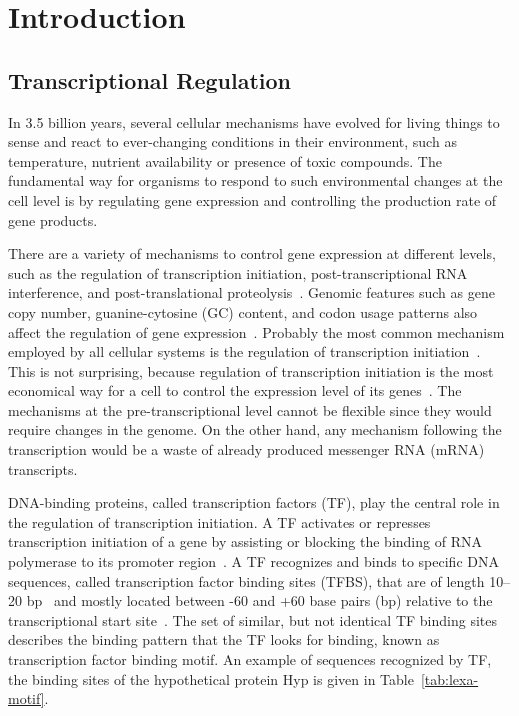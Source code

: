 
\chapter{Introduction}

\section{Transcriptional Regulation}

In 3.5 billion years, several
cellular mechanisms have evolved for living things to sense and react to
ever-changing conditions in their environment, such as temperature, nutrient
availability or presence of toxic compounds. The fundamental way for organisms
to respond to such environmental changes at the cell level is by regulating
gene expression and controlling the production rate of gene products.

There are a variety of mechanisms to control gene expression at different
levels, such as the regulation of transcription
initiation, post-transcriptional RNA interference, and post-translational
proteolysis~\citep{snyder2007molecular}. Genomic features such as gene copy
number, guanine-cytosine (GC) content, and codon usage patterns also affect the
regulation of gene expression~\citep{gustafsson2004codon,
  stranger2007relative}. Probably the most common mechanism employed by all
cellular systems is the regulation of transcription
initiation~\citep{browning2004regulation}. This is not surprising, because
regulation of transcription initiation is the most economical way for a cell to
control the expression level of its genes~\citep{malacinski2005essentials}. The
mechanisms at the pre-transcriptional level cannot be flexible since they would
require changes in the genome. On the other hand, any mechanism following the
transcription would be a waste of already produced messenger RNA (mRNA)
transcripts.

DNA-binding proteins, called transcription factors (TF), play the central role
in the regulation of transcription initiation. A TF activates or represses
transcription initiation of a gene by assisting or blocking the binding of RNA
polymerase to its promoter region~\citep{reznikoff1985regulation}. A TF
recognizes and binds to specific DNA sequences, called transcription factor
binding sites (TFBS), that are of length 10--20 bp~\citep{gerland2002physical,
  berg2004adaptive} and mostly located between -60 and +60 base pairs (bp)
relative to the transcriptional start site~\citep{collado1991control}. The set
of similar, but not identical TF binding sites describes the binding pattern
that the TF looks for binding, known as transcription factor binding motif. An
example of sequences recognized by TF, the binding sites of the hypothetical
protein Hyp is given in Table~\ref{tab:lexa-motif}.

